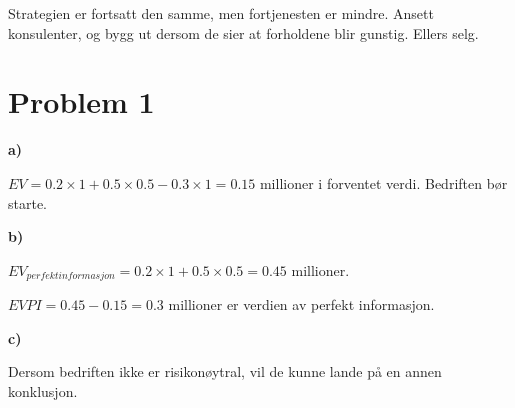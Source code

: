 \documentclass{article}
\begin{document}
Strategien er fortsatt den samme, men fortjenesten er mindre. Ansett konsulenter, og bygg ut dersom de sier at forholdene blir gunstig. Ellers selg.

\section*{\textbf{Problem 1}}
\vspace*{12pt}\small\textbf{a)}

$EV = 0.2 \times 1 + 0.5 \times 0.5 - 0.3 \times 1 = 0.15$ millioner i forventet verdi. Bedriften bør starte. 

\vspace*{12pt}\small\textbf{b)}

$EV_{perfekt informasjon} = 0.2 \times 1 + 0.5 \times 0.5 = 0.45$ millioner.

$EVPI = 0.45 - 0.15 = 0.3$ millioner er verdien av perfekt informasjon. 

\vspace*{12pt}\small\textbf{c)}

Dersom bedriften ikke er risikonøytral, vil de kunne lande på en annen konklusjon.
\end{document}
